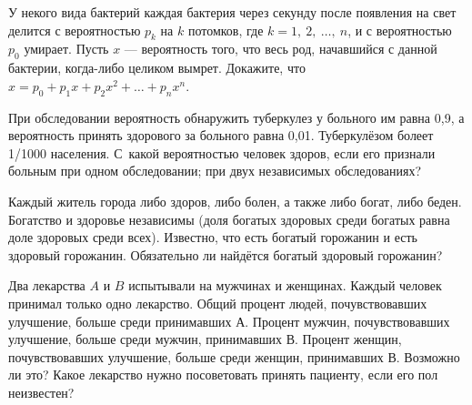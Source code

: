 \documentclass[a4paper,11pt]{article}
\begin{document}
У некого вида бактерий каждая бактерия через секунду после появления
на свет делится с вероятностью $p_k$ на $k$ потомков, где $k=1,\ 2,\ \dots,\ n$, и с вероятностью $p_0$ умирает.
Пусть $x$ --- вероятность того, что весь род, начавшийся с данной бактерии, когда-либо целиком вымрет. Докажите, что
$x=p_0+p_1x+p_2x^2+\dots+p_{n}x^{n}$.

При обследовании вероятность обнаружить туберкулез у больного им равна 0{,}9, а вероятность принять
здорового за больного равна 0{,}01. Туберкулёзом болеет 1/1000 населения. С~какой вероятностью человек здоров,
если его признали больным
 при одном обследовании;
 при двух независимых обследованиях?


Каждый житель города либо здоров, либо болен, а также либо богат, либо беден.
Богатство и здоровье независимы (доля богатых здоровых среди богатых равна доле здоровых среди всех).
Известно, что есть богатый горожанин и есть здоровый
горожанин. Обязательно ли найдётся богатый здоровый горожанин?



Два лекарства $A$ и $B$ испытывали на мужчинах и женщинах. Каждый
человек принимал только одно лекарство. Общий процент людей, почувствовавших улучшение, больше среди принимавших $А$. Процент мужчин, почувствовавших улучшение, больше среди мужчин, принимавших $В$. Процент женщин, почувствовавших улучшение, больше среди женщин, принимавших $В$.
 Возможно ли это?
 Какое лекарство нужно посоветовать принять пациенту, если его пол неизвестен?

%


\end{document}
